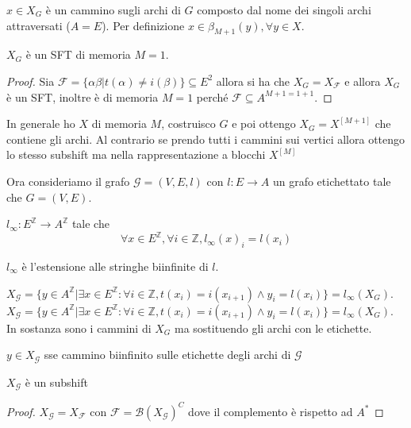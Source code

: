 $x \in X_G$ è un cammino sugli archi di $G$ composto dal nome dei singoli archi attraversati ($A= E$).
Per definizione $x\in \beta_{M + 1}(y), \forall y\in X$.

\begin{teorema}
    $X_G$ è un SFT di memoria $M=1$.
    \begin{proof}
        Sia $\mathcal{F}= \{\alpha\beta|t(\alpha) \ne i(\beta)\}\subseteq E^2$ allora
        si ha che $X_G= X_\mathcal{F}$ e allora $X_G$ è un SFT, inoltre è di memoria
        $M=1$  perché $\mathcal{F}\subseteq A^{M+1=1+1}$.
    \end{proof}
\end{teorema}
In generale ho $X$ di memoria $M$, costruisco $G$ e poi ottengo $X_G = X^{[M+1]}$ che contiene gli
archi. Al contrario se prendo tutti i cammini sui vertici allora ottengo lo stesso
subshift ma nella rappresentazione a blocchi $X^{[M]}$

Ora consideriamo il grafo $\mathcal{G}=(V,E,l)$ con $l:E\to A$ un grafo etichettato
tale che $G=(V,E)$.
\begin{definizione}
    $l_\infty:E^\mathbb{Z}\to A^\mathbb{Z}$ tale che
    $$\forall x\in E^\mathbb{Z}, \forall i \in \mathbb{Z}, l_\infty(x)_i = l(x_i)$$
\end{definizione}
\begin{nota}
    $l_\infty$ è l'estensione alle stringhe biinfinite di $l$.
\end{nota}

\begin{definizione}
    $X_\mathcal{G}= \{y\in A^\mathbb{Z}|\exists x\in E^\mathbb{Z} : \forall i\in \mathbb{Z}, t(x_i) = i(x_{i+1})\land y_i=l(x_i)\}=l_\infty(X_G)$.
    $X_\mathcal{G}= \{y\in A^\mathbb{Z}|\exists x\in E^\mathbb{Z} : \forall i\in \mathbb{Z}, t(x_i) = i(x_{i+1})\land y_i=l(x_i)\}=l_\infty(X_G)$.
    In sostanza sono i cammini di $X_G$ ma sostituendo gli archi con le etichette.
\end{definizione}

\begin{osservazione}
    $y\in X_\mathcal{G}$ sse cammino biinfinito sulle etichette degli archi di $\mathcal{G}$
\end{osservazione}
\begin{nota}
    $X_\mathcal{G}$ è un subshift
    \begin{proof}
        $X_\mathcal{G} = X_\mathcal{F}$ con $\mathcal{F}=\mathcal{B}(X_\mathcal{G})^C$
        dove il complemento è rispetto ad $A^\ast$
    \end{proof}
\end{nota}


